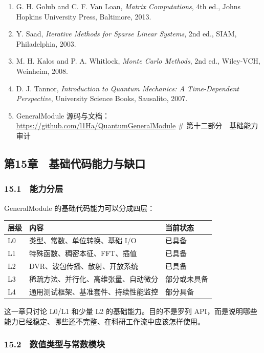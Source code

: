 \documentclass[
]{ctexbook}
\providecommand{\tightlist}{%
  \setlength{\itemsep}{0pt}\setlength{\parskip}{0pt}}
\let\origsubsection\subsection
\renewcommand{\subsection}[1]{%
  \needspace{6\baselineskip}%
  \origsubsection{#1}%
}
\begin{document}
\begin{enumerate}
\def\labelenumi{\arabic{enumi}.}
\tightlist
\item
  G. H. Golub and C. F. Van Loan, \emph{Matrix Computations}, 4th ed.,
  Johns Hopkins University Press, Baltimore, 2013.
\item
  Y. Saad, \emph{Iterative Methods for Sparse Linear Systems}, 2nd ed.,
  SIAM, Philadelphia, 2003.
\item
  M. H. Kalos and P. A. Whitlock, \emph{Monte Carlo Methods}, 2nd ed.,
  Wiley-VCH, Weinheim, 2008.
\item
  D. J. Tannor, \emph{Introduction to Quantum Mechanics: A
  Time-Dependent Perspective}, University Science Books, Sausalito,
  2007.
\item
  GeneralModule
  源码与文档：\url{https://github.com/l1Ha/QuantumGeneralModule} \#
  第十二部分　基础能力审计
\end{enumerate}

\hypertarget{ux7b2c15ux7ae0-ux57faux7840ux4ee3ux7801ux80fdux529bux4e0eux7f3aux53e3}{%
\subsection{第15章　基础代码能力与缺口}\label{ux7b2c15ux7ae0-ux57faux7840ux4ee3ux7801ux80fdux529bux4e0eux7f3aux53e3}}

\hypertarget{ux80fdux529bux5206ux5c42}{%
\subsubsection{15.1　能力分层}\label{ux80fdux529bux5206ux5c42}}

GeneralModule 的基础代码能力可以分成四层：

\begin{longtable}[]{@{}lll@{}}
\toprule
层级 & 内容 & 当前状态\tabularnewline
\midrule
\endhead
L0 & 类型、常数、单位转换、基础 I/O & 已具备\tabularnewline
L1 & 特殊函数、稠密本征、FFT、插值 & 已具备\tabularnewline
L2 & DVR、波包传播、散射、开放系统 & 已具备\tabularnewline
L3 & 稀疏方法、并行化、高维张量、自动微分 & 部分或未具备\tabularnewline
L4 & 通用测试框架、基准套件、持续性能监控 & 部分具备\tabularnewline
\bottomrule
\end{longtable}

这一章只讨论 L0/L1 和少量 L2 的基础能力。目的不是罗列
API，而是说明哪些能力已经稳定、哪些还不完整、在科研工作流中应该怎样使用。

\hypertarget{ux6570ux503cux7c7bux578bux4e0eux5e38ux6570ux6a21ux5757}{%
\subsubsection{15.2　数值类型与常数模块}\label{ux6570ux503cux7c7bux578bux4e0eux5e38ux6570ux6a21ux5757}}
\end{document}
